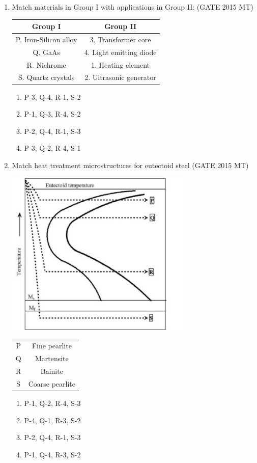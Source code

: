 \documentclass[12pt]{article}
\begin{document}
\begin{enumerate}
\item Match materials in Group I with applications in Group II: (GATE 2015 MT)
\begin{table}[h]
\centering
\begin{tabular}{|c|c|}
\hline
Group I & Group II \\
\hline
P. Iron-Silicon alloy & 3. Transformer core \\
Q. GaAs & 4. Light emitting diode \\
R. Nichrome & 1. Heating element \\
S. Quartz crystals & 2. Ultrasonic generator \\
\hline
\end{tabular}
\end{table}
\begin{enumerate}[label=(\alph*)]
  \item P-3, Q-4, R-1, S-2
  \item P-1, Q-3, R-4, S-2
  \item P-2, Q-4, R-1, S-3
  \item P-3, Q-2, R-4, S-1
\end{enumerate}

\item Match heat treatment microstructures for eutectoid steel (GATE 2015 MT)
\begin{center}
  \includegraphics[width=0.7\textwidth]{images/q53i.jpg}
\end{center}
\begin{tabular}{|c|c|}
\hline
P & Fine pearlite \\
Q & Martensite \\
R & Bainite \\
S & Coarse pearlite \\
\hline
\end{tabular}
\begin{enumerate}[label=(\alph*)]
  \item P-1, Q-2, R-4, S-3
  \item P-4, Q-1, R-3, S-2
  \item P-2, Q-4, R-1, S-3
  \item P-1, Q-4, R-3, S-2
\end{enumerate}


\end{enumerate}
\end{document}
